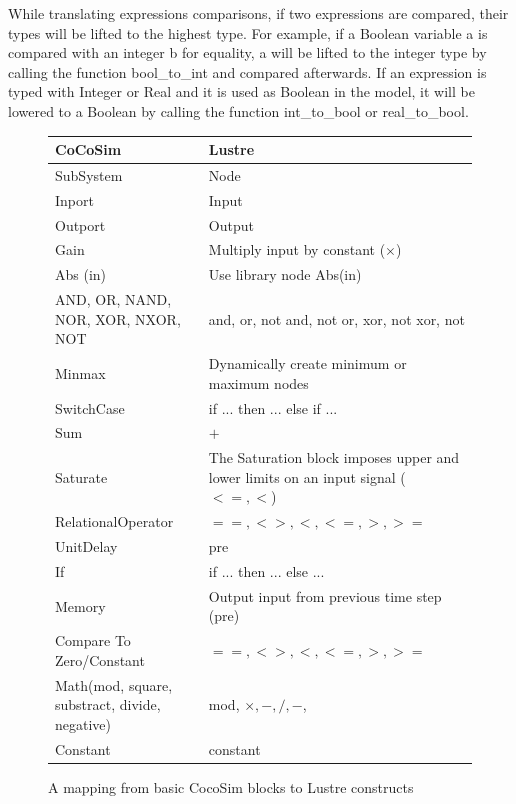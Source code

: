 \documentclass{article}
\begin{document}
While translating expressions comparisons, if two expressions are compared, 
their types will be lifted to the highest type. For example, if a Boolean variable \textsf{a} 
is compared with an integer \textsf{b} for equality, \textsf{a} will be lifted to the integer 
type by calling the function \textsf{bool\_to\_int} and compared afterwards. 
If an expression is typed with Integer or Real and it is used as Boolean in the model,  it will be lowered 
to a Boolean by calling the function \textsf{int\_to\_bool} or \textsf{real\_to\_bool}.
 

\begin{figure}[t]
\centering
{
\begin{tabular}{lp{5cm}}
\hline
\textbf{CoCoSim} & \textbf{Lustre}  \\
\hline
SubSystem & 
Node
\\
Inport &
Input
\\
Outport &
Output
\\
Gain &
Multiply input by constant ($\times$)
\\

Abs (in) &
Use library node Abs(in)
\\

AND, OR, NAND, NOR, XOR, NXOR, NOT
&
and, or, not and, not or, xor, not xor, not
\\

Minmax &
{Dynamically create minimum or maximum nodes}
\\

SwitchCase &
{if ... then ... else if ... }
\\

Sum &
$+$
\\

Saturate &
The Saturation block imposes upper and lower limits on an input signal ($<=, <$)
\\

RelationalOperator &
$==, <>, <, <=, >, >=$
\\

UnitDelay &
pre
\\

If &
if ... then ... else ...
\\

Memory &
Output input from previous time step (pre)
\\

Compare To Zero/Constant  &
$==, <>, <, <=, >, >=$
\\

Math(mod, square, substract, divide, negative) &
mod, $\times, -, /, - $, 
\\

Constant &
constant
\\

\hline
\end{tabular}
}
\caption{A mapping from basic CocoSim blocks to Lustre constructs}
\label{basicmapping}
\end{figure}
\end{document}
